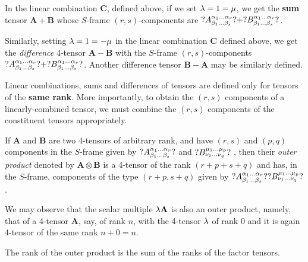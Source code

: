 In the linear combination $\mathbf{C}$, defined above,  
if we set   ${\lambda}=1={\mu}$, we get the \textbf{sum} 
tensor $\mathbf{A} + \mathbf{B}$ whose $S$-frame  
$(r,s)$-components are  $?A^{{{\alpha}_1}\dots 
{\ensuremath{{\alpha}}_r}}_{{{\beta}_1}\dots {\ensuremath{{\beta}}_s}}?  +  
?B^{{{\alpha}_1}\dots {\ensuremath{{\alpha}}_r}}_{{{\beta}_1}
\dots {\ensuremath{{\beta}}_s}}?$.

Similarly, setting  ${\lambda}=1=-{\mu}$ in the linear 
combination $\mathbf{C}$ defined above, we get     the 
\textit{difference} 4-tensor $\mathbf{A} - \mathbf{B}$ 
with the $S$-frame $(r,s)$-components  
$?A^{{{\alpha}_1}\dots {\ensuremath{{\alpha}}_r}}_{{{\beta}_1} \dots {\ensuremath{{\beta}}_s}}? 
+  ?B^{{{\alpha}_1}\dots {\ensuremath{{\alpha}}_r}}_{{{\beta}_1}\dots 
{\ensuremath{{\beta}}_s}}?$. Another difference tensor $\mathbf{B} - 
\mathbf{A}$ may be similarly defined.

 Linear combinations, sums and 
differences of tensors are defined only for tensors of 
the \textbf{same rank}. More importantly, to obtain 
the $(r,s)$ components of a
linearly-combined tensor, we must combine the $(r,s)$ 
components of the constituent tensors appropriately.

  
If $\mathbf{A}$ and $\mathbf{B}$ are two 4-tensors of 
arbitrary rank, and have  $(r,s)$ and $(p,q)$ 
components in the $S$-frame given by $ 
?A^{{{\alpha}_1}\dots {\ensuremath{{\alpha}}_r}}_{{{\beta}_1} \dots {\ensuremath{{\beta}}_s}}? 
$ and $ ?B^{{{\mu}_1}\dots {\ensuremath{{\mu}}_p}}_{{{\nu}_1}\dots 
{\ensuremath{{\nu}}_q}}? \;$, then their \textit{outer product} 
denoted by $ \mathbf{A} \otimes \mathbf{B} $  is a 
4-tensor of the rank $ (r+p+s+q) $ and has, in the 
$S$-frame, components of the type $(r+p,s+q)$ given by  
$?A^{{{\alpha}_1}\dots {\ensuremath{{\alpha}}_r}}_{{{\beta}_1}\dots 
{\ensuremath{{\beta}}_s}}? ?B^{{{\mu}_1}\dots 
{\ensuremath{{\mu}}_p}}_{{{\nu}_1}\dots {\ensuremath{{\nu}}_q}}?$.

We may observe that the scalar multiple $ {\lambda} 
\mathbf{A} $ is also an outer product, namely, that of 
a 4-tensor $\mathbf{A}$,  say, of rank $n$,  with the 
4-tensor ${\lambda}$ of rank $0$ and it is again 4-tensor of 
the same rank $n+0=n$. 

The rank of the outer product is the sum of the ranks 
of the factor tensors. 

